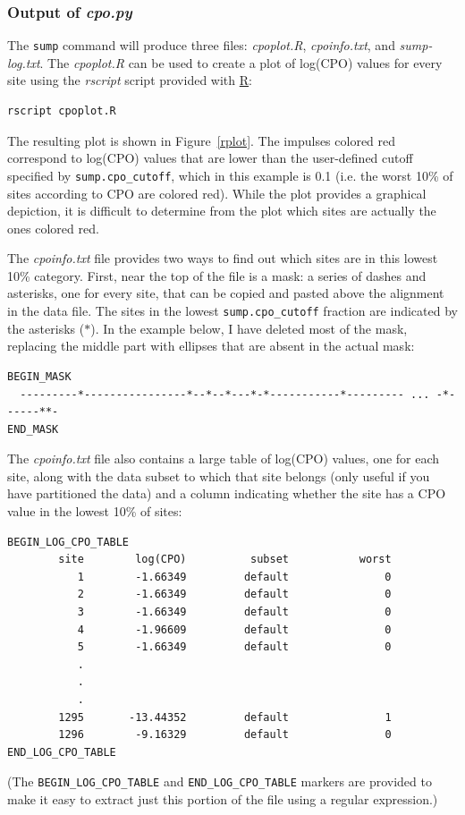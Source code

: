\documentclass[10pt]{article}
\newcommand{\pathname}[1]{{\em #1}}				%
\newcommand{\code}[1]{{\tt #1}}					%
\newcommand{\cmd}[1]{{\tt \small #1}\index{#1}}	%
\newcommand{\opt}[2]{{\tt \small #1.#2}\index{#1!#2}}	%
\newcommand{\Rurl}{\href{http://www.r-project.org/}{R}\index{R}}
\begin{document}
\subsubsection{Output of \pathname{cpo.py}}
\begin{samepage}
The \cmd{sump} command will produce three files: \pathname{cpoplot.R}, \pathname{cpoinfo.txt}, and \pathname{sump-log.txt}. The \pathname{cpoplot.R} can be used to create a plot of log(CPO) values for every site using the \pathname{rscript} script provided with \Rurl:
\begin{verbatim}
rscript cpoplot.R
\end{verbatim}
The resulting plot is shown in Figure~\ref{rplot}. The impulses colored red correspond to log(CPO) values that are lower than the user-defined cutoff specified by \opt{sump}{cpo\_cutoff}, which in this example is 0.1 (i.e. the worst 10\% of sites according to CPO are colored red). While the plot provides a graphical depiction, it is difficult to determine from the plot which sites are actually the ones colored red.  
\end{samepage}

\begin{samepage}
The \pathname{cpoinfo.txt} file provides two ways to find out which sites are in this lowest 10\% category. First, near the top of the file is a mask: a series of dashes and asterisks, one for every site, that can be copied and pasted above the alignment in the data file. The sites in the lowest \opt{sump}{cpo\_cutoff} fraction are indicated by the asterisks ($\ast$). In the example below, I have deleted most of the mask, replacing the middle part with ellipses that are absent in the actual mask:
\begin{verbatim}
BEGIN_MASK
  ---------*----------------*--*--*---*-*-----------*--------- ... -*------**-
END_MASK
\end{verbatim}
\end{samepage}

\begin{samepage}
The \pathname{cpoinfo.txt} file also contains a large table of log(CPO) values, one for each site, along with the data subset to which that site belongs (only useful if you have partitioned the data) and a column indicating whether the site has a CPO value in the lowest 10\% of sites:
\begin{verbatim}
BEGIN_LOG_CPO_TABLE
        site	    log(CPO)	      subset	       worst
           1	    -1.66349	     default	           0
           2	    -1.66349	     default	           0
           3	    -1.66349	     default	           0
           4	    -1.96609	     default	           0
           5	    -1.66349	     default	           0
           .
           .
           .
        1295	   -13.44352	     default	           1
        1296	    -9.16329	     default	           0
END_LOG_CPO_TABLE
\end{verbatim}
(The \code{BEGIN\_LOG\_CPO\_TABLE} and \code{END\_LOG\_CPO\_TABLE} markers are provided to make it easy to extract just this portion of the file using a regular expression.)
\end{samepage}
\end{document}
